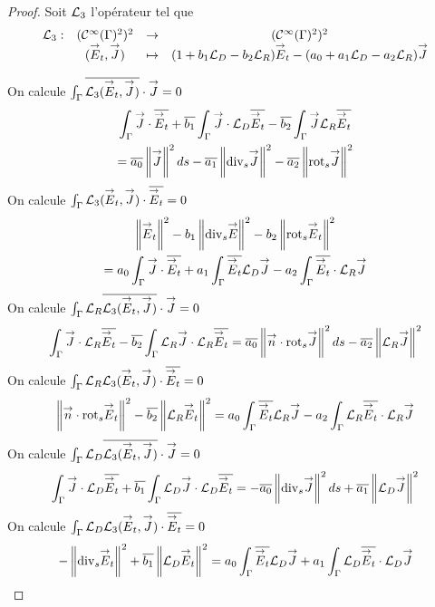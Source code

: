   \begin{proof}
    Soit \(\mathcal{L}_3\) l'opérateur tel que
    \begin{equation}
      \label{eq:unicite:ci3:L3}
      \begin{matrix}
      \LL_3:& (\mathcal{C}^\infty(\Gamma)^2)^2 & \rightarrow & (\mathcal{C}^\infty(\Gamma)^2)^2
      \\
      &(\vE_t,\vJ) & \mapsto & ( 1 + b_1 \LD - b_2 \LR) \vE_t - (a_0 + a_1 \LD - a_2 \LR ) \vJ
      \end{matrix}
    \end{equation}

    On calcule \(\int_\Gamma {\overline{\mathcal{L}_3({\overset{\rightarrow}{E}}_t,{\overset{\rightarrow}{J}})}}\cdot {\overset{\rightarrow}{J}} = 0\)
    \begin{multline}
      \label{eq:unicite:ci3:csu3-1}
      \int_\Gamma \vJ \cdot \conj{\vE_t}   + \conj{b_1} \int_\Gamma \vJ\cdot \LD\conj{\vE_t}  - \conj{b_2} \int_\Gamma \vJ \LR\conj{\vE_t}  \\
      = \conj{a_0} \norm{\vJ}^2ds - \conj{a_1} \norm{\tdivs \vJ}^2  - \conj{a_2} \norm{\trots \vJ}^2 
    \end{multline}
    On calcule \(\int_\Gamma {\mathcal{L}_3({\overset{\rightarrow}{E}}_t,{\overset{\rightarrow}{J}})}\cdot {\overline{{\overset{\rightarrow}{E}}_t}} = 0\)
    \begin{multline}
      \label{eq:unicite:ci3:csu3-2}
      \norm{\vE_t}^2   - b_1 \norm{ \tdivs \vE }^2  - b_2 \norm{\trots \vE_t}^2  \\
      = a_0 \int_\Gamma \vJ\cdot \conj{\vE_t} + a_1 \int_\Gamma \conj{\vE_t} \LD \vJ  - a_2 \int_\Gamma \conj{\vE_t} \cdot \LR \vJ 
    \end{multline}
    On calcule \(\int_\Gamma {\mathcal{L}_R}{\overline{\mathcal{L}_3({\overset{\rightarrow}{E}}_t,{\overset{\rightarrow}{J}})}}\cdot{\overset{\rightarrow}{J}} = 0\)
    \begin{equation}
      \label{eq:unicite:ci3:csu3-3}
      \int_\Gamma \vJ \cdot \LR \conj{\vE_t}   - \conj{b_2} \int_\Gamma \LR \vJ \cdot \LR \conj{\vE_t}
      =  \conj{a_0} \norm{\vn \cdot \trots \vJ}^2ds - \conj{a_2} \norm{ \LR \vJ}^2 
    \end{equation}
    On calcule \(\int_\Gamma {\mathcal{L}_R}{\mathcal{L}_3({\overset{\rightarrow}{E}}_t,{\overset{\rightarrow}{J}})}\cdot{\overline{{\overset{\rightarrow}{E}}_t}}=0\)
    \begin{equation}
      \label{eq:unicite:ci3:csu3-4}
      \norm{ \vn \cdot \trots \vE_t }^2   - \conj{b_2} \norm{ \LR \vE_t}^2 
      = a_0 \int_\Gamma \conj{\vE_t} \LR \vJ  - a_2 \int_\Gamma \LR \conj{\vE_t} \cdot \LR \vJ 
    \end{equation}
    On calcule \(\int_\Gamma {\mathcal{L}_D}{\overline{\mathcal{L}_3({\overset{\rightarrow}{E}}_t,{\overset{\rightarrow}{J}})}}\cdot{\overset{\rightarrow}{J}}=0\)
    \begin{equation}
      \label{eq:unicite:ci3:csu3-5}
      \int_\Gamma \vJ \cdot \LD \conj{\vE_t}   + \conj{b_1} \int_\Gamma \LD \vJ \cdot \LD \conj{\vE_t}
      = - \conj{a_0} \norm{\tdivs \vJ}^2ds + \conj{a_1} \norm{ \LD \vJ}^2 
    \end{equation}
    On calcule \(\int_\Gamma {\mathcal{L}_D}{\mathcal{L}_3({\overset{\rightarrow}{E}}_t,{\overset{\rightarrow}{J}})}\cdot{\overline{{\overset{\rightarrow}{E}}_t}}=0\)
    \begin{equation}
      \label{eq:unicite:ci3:csu3-6}
      -\norm{ \tdivs \vE_t }^2   + \conj{b_1} \norm{ \LD \vE_t}^2
      = a_0 \int_\Gamma \conj{\vE_t} \LD \vJ  + a_1 \int_\Gamma \LD \conj{\vE_t} \cdot \LD \vJ 
    \end{equation}


\end{proof}
